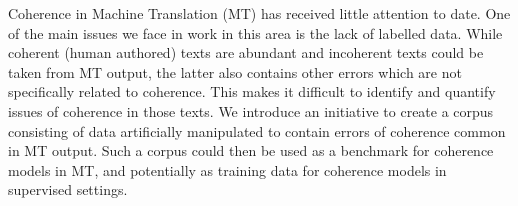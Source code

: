 Coherence in Machine Translation (MT) has received little attention to date. One of the main issues we face in work in this area is the lack of labelled data. While coherent (human authored) texts are abundant and incoherent texts could be taken from MT output, the latter also contains other errors which are not specifically related to coherence. This makes it difficult to identify and quantify issues of coherence in those texts. We introduce an initiative to create a corpus consisting of data artificially manipulated to contain errors of coherence common in MT output. Such a corpus could then be used as a benchmark for coherence models in MT, and potentially as training data for coherence models in supervised settings.
